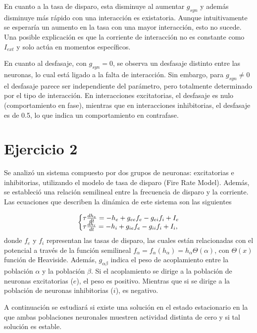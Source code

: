 \documentclass[aps,prb,twocolumn,superscriptaddress,floatfix,longbibliography]{revtex4-2}
\newcounter{para}
\begin{document}
En cuanto a la tasa de disparo, esta disminuye al aumentar \(g_{syn}\) y además disminuye más rápido con una interacción es existatoria. Aunque intuitivamente se esperaría un aumento en la tasa con una mayor interacción, esto no sucede. Una posible explicación es que la corriente de interacción no es constante como $I_{ext}$ y solo actúa en momentos específicos.

En cuanto al desfasaje, con $g_{syn} = 0$, se observa un desfasaje distinto entre las neuronas, lo cual está ligado a la falta de interacción. Sin embargo, para $g_{syn} \neq 0$ el desfasaje parece ser independiente del parámetro, pero totalmente determinado por el tipo de interacción. En interacciones excitatorias, el desfasaje es nulo (comportamiento en fase), mientras que en interacciones inhibitorias, el desfasaje es de 0.5, lo que indica un comportamiento en contrafase.

\section{Ejercicio 2}


Se analizó un sistema compuesto por dos grupos de neuronas: excitatorias e inhibitorias, utilizando el modelo de tasa de disparo (Fire Rate Model). Además, se estableció una relación semilineal entre la frecuencia de disparo y la corriente. Las ecuaciones que describen la dinámica de este sistema son las siguientes

\[
\left\{\begin{array}{@{}l@{}}
    \tau \frac{dh_e}{dt} = -h_e + g_{ee} f_e - g_{ei} f_i + I_e \\
    \tau \frac{dh_i}{dt} = -h_i + g_{ie} f_e - g_{ii} f_i + I_i,
    \end{array}\right.
\]
donde $f_e$ y $f_i$ representan las tasas de disparo, las cuales están relacionadas con el potencial a través de la función semilineal $f_\alpha = f_\alpha(h_\alpha) = h_\alpha\Theta(\alpha)$, con $\Theta(x)$ función de Heaviside. Además, $g_{\alpha \beta}$ indica el peso de acoplamiento entre la población $\alpha$ y la población $\beta$. Si el acoplamiento se dirige a la población de neuronas excitatorias ($e$), el peso es positivo. Mientras que si se dirige a la población de neuronas inhibitorias ($i$), es negativo.

A continuación se estudiará si existe una solución en el estado estacionario en la que ambas poblaciones neuronales muestren actividad distinta de cero y si tal solución es estable.
\end{document}
